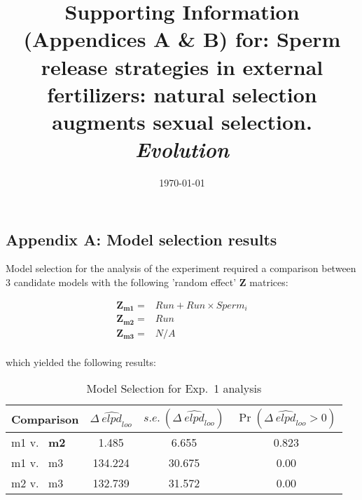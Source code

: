 \documentclass{article}
\title{Supporting Information (Appendices A \& B) for: Sperm release strategies in external fertilizers: natural selection augments sexual selection. \textit{Evolution}}
\date{\today}
\begin{document}
\maketitle

\bigskip

\bigskip

\newpage


\subsection*{Appendix A: Model selection results}
\renewcommand{\theequation}{S\arabic{equation}}
\setcounter{equation}{0}
\renewcommand{\thefigure}{S\arabic{figure}}
\setcounter{figure}{0}
\renewcommand{\thetable}{S\arabic{table}}
\setcounter{table}{0}


Model selection for the analysis of the  experiment required a comparison between 3 candidate models with the following 'random effect' $\mathbf{Z}$ matrices:

\begin{align*}
	\mathbf{Z_{m1}} = &Run + Run \times Sperm_i \\
	\mathbf{Z_{m2}} = &Run \\
	\mathbf{Z_{m3}} = &N/A \\
\end{align*}

\noindent{} which yielded the following results: 

\begin{table}[!ht]
\caption{Model Selection for Exp.~1 analysis}
\label{Table:Exp1ModComp}
\centering
\begin{tabular}{l c c c } \hline
Comparison & $\Delta~\widehat{\textit{elpd}}_{\textit{loo}}$ & $s.e.~(\Delta~\widehat{\textit{elpd}}_{\textit{loo}})$ & $\Pr(\Delta~\widehat{\textit{elpd}}_{\textit{loo}} > 0)$ \\
\hline
m1 v.~ \textbf{m2}  & 1.485   & 6.655  & 0.823 \\
m1 v.~ m3 & 134.224 & 30.675 & 0.00  \\
m2 v.~ m3 & 132.739 & 31.572 & 0.00  \\
\hline
\end{tabular}
\bigskip{}
\end{table}
\end{document}
